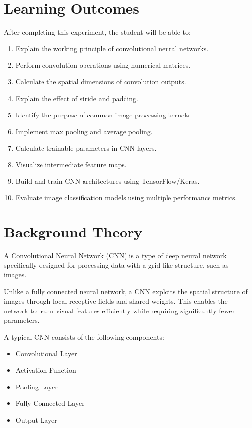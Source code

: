 \documentclass[11pt]{article}
\begin{document}
\section{Learning Outcomes}
After completing this experiment, the student will be able to:
\begin{enumerate}
    \item Explain the working principle of convolutional neural networks.
    \item Perform convolution operations using numerical matrices.
    \item Calculate the spatial dimensions of convolution outputs.
    \item Explain the effect of stride and padding.
    \item Identify the purpose of common image-processing kernels.
    \item Implement max pooling and average pooling.
    \item Calculate trainable parameters in CNN layers.
    \item Visualize intermediate feature maps.
    \item Build and train CNN architectures using TensorFlow/Keras.
    \item Evaluate image classification models using multiple performance metrics.
\end{enumerate}

\section{Background Theory}
A Convolutional Neural Network (CNN) is a type of deep neural network specifically designed for processing data with a grid-like structure, such as images.

Unlike a fully connected neural network, a CNN exploits the spatial structure of images through local receptive fields and shared weights. This enables the network to learn visual features efficiently while requiring significantly fewer parameters.

A typical CNN consists of the following components:
\begin{itemize}
    \item Convolutional Layer
    \item Activation Function
    \item Pooling Layer
    \item Fully Connected Layer
    \item Output Layer
\end{itemize}
\end{document}
